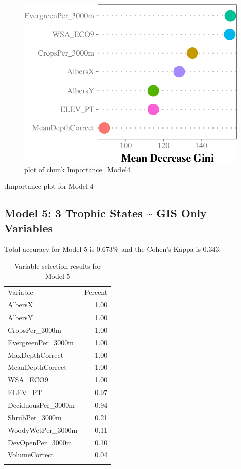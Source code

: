 \documentclass[11pt,]{article}
\begin{document}
\begin{figure}[htbp]
\centering
\includegraphics{./manuscript_files/figure-latex/Importance_Model4.pdf}
\caption{plot of chunk Importance\_Model4}
\end{figure}

:Importance plot for Model 4

\subsection{Model 5: 3 Trophic States \textasciitilde{} GIS Only
Variables}\label{model-5-3-trophic-states-gis-only-variables}

Total accuracy for Model 5 is 0.673\% and the Cohen's Kappa is 0.343.

\begin{longtable}[c]{@{}lr@{}}
\toprule\addlinespace
Variable & Percent
\\\addlinespace
\midrule\endhead
AlbersX & 1.00
\\\addlinespace
AlbersY & 1.00
\\\addlinespace
CropsPer\_3000m & 1.00
\\\addlinespace
EvergreenPer\_3000m & 1.00
\\\addlinespace
MaxDepthCorrect & 1.00
\\\addlinespace
MeanDepthCorrect & 1.00
\\\addlinespace
WSA\_ECO9 & 1.00
\\\addlinespace
ELEV\_PT & 0.97
\\\addlinespace
DeciduousPer\_3000m & 0.94
\\\addlinespace
ShrubPer\_3000m & 0.21
\\\addlinespace
WoodyWetPer\_3000m & 0.11
\\\addlinespace
DevOpenPer\_3000m & 0.10
\\\addlinespace
VolumeCorrect & 0.04
\\\addlinespace
\bottomrule
\addlinespace
\caption{Variable selection results for Model 5}
\end{longtable}
\end{document}
